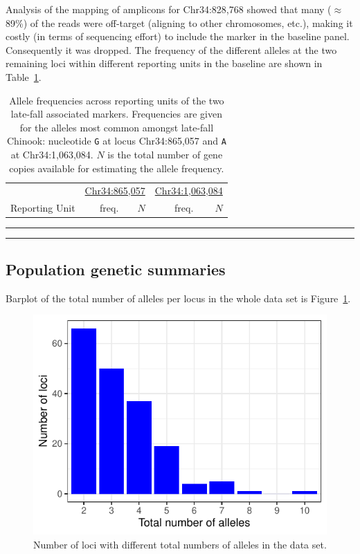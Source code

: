 Analysis of the mapping of amplicons for Chr34:828,768 
showed that many ($\approx$89\%) of the reads were off-target (aligning to other chromosomes, 
etc.), making it costly (in terms of sequencing effort) to include the marker in the baseline panel. 
Consequently it was dropped.  The frequency of the different alleles at the two remaining loci
within different reporting units in the baseline are shown in Table~\ref{tab:lfar-freqs}.
\begin{table}
\caption{\footnotesize Allele frequencies across reporting units of the two late-fall associated
markers.  Frequencies are given for the alleles most common amongst late-fall Chinook: nucleotide 
{\tt G} at locus Chr34:865,057 and {\tt A} at Chr34:1,063,084.  $N$ is the total number of gene 
copies available for estimating the allele frequency.}
\label{tab:lfar-freqs}
{\footnotesize
\begin{tabular*}{\columnwidth}{@{\extracolsep{\fill}} lrrrr}
\hline\hline
& \multicolumn{2}{c}{\underline{Chr34:865,057}} & \multicolumn{2}{c}{\underline{Chr34:1,063,084}} \\
Reporting Unit & freq. & $N$ & freq. & $N$ \\ \hline

\end{tabular*}
}
\vspace*{-2.3ex}\hrule\vspace*{0.3ex}\hrule
\end{table}
\subsection*{Population genetic summaries}

Barplot of the total number of alleles per locus in the whole data set
is Figure~\ref{fig:num-alle}.
\begin{figure}
\newcommand{\numacap}{\footnotesize Number of loci with different
total numbers of alleles in the data set.}
\begin{center}
\includegraphics[width=\columnwidth]{images/num-alle-barplot.pdf}
\end{center}
\caption[\numacap]{\numacap}
\label{fig:num-alle}
\end{figure}

